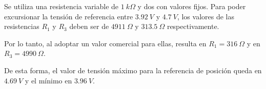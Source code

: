  
 \noindent Se utiliza una resistencia variable de $1\:k\Omega$ y dos con valores fijos. Para poder excursionar la tensión de referencia entre $3.92\:V$ y $4.7\:V$, los valores de las resistencias $R_1$ y $R_3$ deben ser de $4911\:\Omega$ y $313.5\:\Omega$ respectivamente. 
 
\noindent Por lo tanto, al adoptar un valor comercial para ellas, resulta en $R_1 = 316 \:\Omega$ y en $R_3 = 4990 \:\Omega$.
 
\noindent De esta forma, el valor de tensión máximo para la referencia de posición queda en $4.69\:V$ y el mínimo en $3.96\:V$.
 
